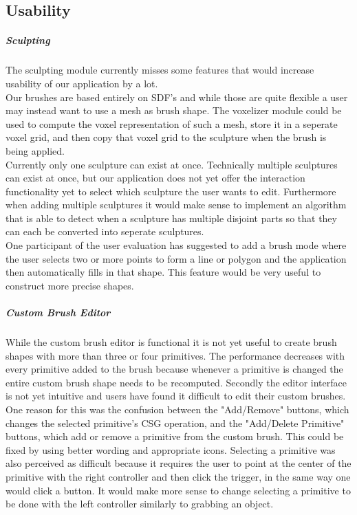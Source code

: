 \subsection{Usability}

\subparagraph{Sculpting}
The sculpting module currently misses some features that would increase usability of our application by a lot.\\
Our brushes are based entirely on SDF's and while those are quite flexible a user may instead want to use a mesh as brush shape. The voxelizer module could be used to compute the voxel representation of such a mesh, store it in a seperate voxel grid, and then copy that voxel grid to the sculpture when the brush is being applied.\\
Currently only one sculpture can exist at once. Technically multiple sculptures can exist at once, but our application does not yet offer the interaction functionality yet to select which sculpture the user wants to edit. Furthermore when adding multiple sculptures it would make sense to implement an algorithm that is able to detect when a sculpture has multiple disjoint parts so that they can each be converted into seperate sculptures.\\
One participant of the user evaluation has suggested to add a brush mode where the user selects two or more points to form a line or polygon and the application then automatically fills in that shape. This feature would be very useful to construct more precise shapes.

\subparagraph{Custom Brush Editor}
While the custom brush editor is functional it is not yet useful to create brush shapes with more than three or four primitives. The performance decreases with every primitive added to the brush because whenever a primitive is changed the entire custom brush shape needs to be recomputed. Secondly the editor interface is not yet intuitive and users have found it difficult to edit their custom brushes. One reason for this was the confusion between the "Add/Remove" buttons, which changes the selected primitive's CSG operation, and the "Add/Delete Primitive" buttons, which add or remove a primitive from the custom brush. This could be fixed by using better wording and appropriate icons. Selecting a primitive was also perceived as difficult because it requires the user to point at the center of the primitive with the right controller and then click the trigger, in the same way one would click a button. It would make more sense to change selecting a primitive to be done with the left controller similarly to grabbing an object.

